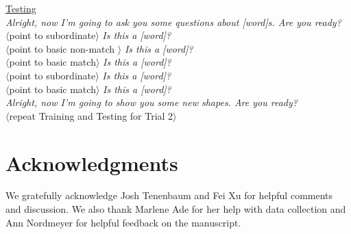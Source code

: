 \documentclass[man]{apa2}
\begin{document}
\noindent \underline{Testing} \\
{\it Alright, now I'm going to ask you some questions about [word]s. Are you ready?} \\
$\langle$point to subordinate$\rangle$ {\it Is this a [word]?} \\
$\langle$point to basic non-match $\rangle$ {\it Is this a [word]?} \\
$\langle$point to basic match$\rangle$ {\it Is this a [word]?}\\
$\langle$point to subordinate$\rangle$ {\it Is this a [word]?} \\
$\langle$point to basic match$\rangle$ {\it Is this a [word]?} \\
 
{\it Alright, now I'm going to show you some new shapes. Are you ready?}\\

\vspace{2.5mm}
\noindent $\langle$repeat Training and Testing for Trial 2$\rangle$ \\

\nocite{re2013}
\nocite{sanchez2003effect}

\section{Acknowledgments}

We gratefully acknowledge Josh Tenenbaum and Fei Xu for helpful comments and discussion. We also thank Marlene Ade for her help with data collection and Ann Nordmeyer for helpful feedback on the manuscript. 




\newpage
\theappendix 
\end{document}

